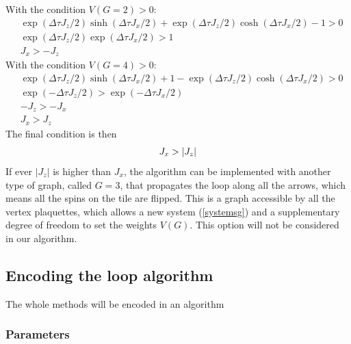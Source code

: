 \documentclass[a4paper,12pt,twoside]{article}
\begin{document}
{	With the condition $V(G=2) > 0$:
	\begin{equation}
		\begin{split}
		&\exp(\Delta \tau J_{z}/2)\sinh(\Delta\tau J_{x}/2) + \exp(\Delta \tau J_{z}/2)\cosh(\Delta\tau J_{x}/2) - 1  > 0 \\
		&\exp(\Delta \tau J_{z}/2)\exp(\Delta\tau J_{x}/2)  > 1\\
		&J_{x} > - J_{z}
		\end{split}
	\end{equation}
	With the condition $V(G=4) > 0$:
	\begin{equation}
		\begin{split}
		&\exp(\Delta \tau J_{z}/2)\sinh(\Delta\tau J_{x}/2) + 1 - \exp(\Delta \tau J_{z}/2)\cosh(\Delta\tau J_{x}/2) > 0 \\
		&\exp(- \Delta \tau J_{z}/2)  > \exp(- \Delta\tau J_{x}/2)\\
		&- J_{z} > - J_{x}\\
		& J_{x} > J_{z}
		\end{split}
	\end{equation}
	The final condition is then
	\begin{equation}
		\centering
		J_{x} > |J_{z}|
	\end{equation}
	If ever $|J_{z}|$ is higher than $J_{x}$, the algorithm can be implemented with another type of graph, called $G = 3$, that propagates the loop along all the arrows, which means all the spins on the tile are flipped. This is a graph accessible by all the vertex plaquettes, which allows a new system (\ref{systemsg}) and a supplementary degree of freedom to set the weights $V(G)$. This option will not be considered in our algorithm.
	
	\subsection{Encoding the loop algorithm}
	The whole methods will be encoded in an algorithm
	\subsubsection{Parameters}
}
\end{document}
